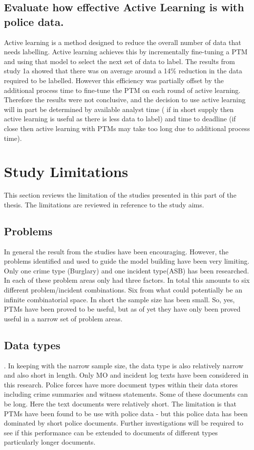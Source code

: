 \subsection{Evaluate how effective Active Learning is with police data.}  Active learning is a method designed to reduce the overall number of data that needs labelling. Active learning achieves this by incrementally fine-tuning a PTM and using that model to select the next set of data to label. The results from study 1a showed that there was on average around a 14\% reduction in the data required to be labelled. However this efficiency was partially offset by the additional process time to fine-tune the PTM on each round of active learning. Therefore the results were not conclusive, and the decision to use active learning will in part be determined by available analyst time ( if in short supply then active learning is useful as there is less data to label)  and time to deadline (if close then active learning with PTMs may take too long due to additional process time).

\section{Study Limitations} This section reviews the limitation of the studies presented in this part of the thesis. The limitations are reviewed in reference to the study aims.

\subsection{Problems} In general the result from the studies have been encouraging. However, the problems identified and used to guide the model building have been very limiting. Only one crime type (Burglary) and one incident type(ASB) has been researched. In each of these problem areas only had three factors. In total this amounts to six different problem/incident combinations. Six from what could potentially be an infinite combinatorial space. In short the sample size has been small. So, yes, PTMs have been proved to be useful, but as of yet they have only been proved useful in a narrow set of problem areas. 

\subsection{Data types}. In keeping with the narrow sample size, the data type is also relatively narrow and also short in length. Only MO and incident log texts have been considered in this research. Police forces have  more document types within their data stores including crime summaries and witness statements. Some of these documents can be long. Here the text documents were relatively short. The limitation is that PTMs have been found to be use with police data - but this police data has been dominated by short police documents. Further investigations will be required to see if this performance can be extended to documents of different types particularly longer documents.   

